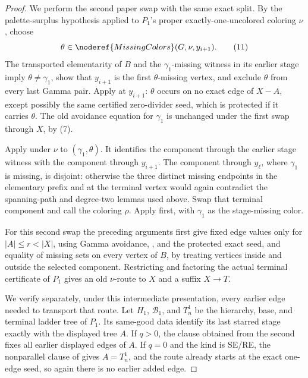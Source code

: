 \begin{proof}
We perform the second paper swap with the same exact split.  By the
palette-surplus hypothesis applied to \(P_1\)'s proper exactly-one-uncolored
coloring \(\nu\), choose
\[
                    \theta\in\noderef{MissingColors}(G,\nu,y_{i+1}). \tag{11}
\]
The transported elementarity of \(B\) and the
\(\gamma_1\)-missing witness in its earlier stage imply
\(\theta\ne\gamma_1\), show that \(y_{i+1}\) is the first
\(\theta\)-missing vertex, and exclude \(\theta\) from every last Gamma
pair.  Apply  at \(y_{i+1}\):
\(\theta\) occurs on no exact edge of \(X-A\), except possibly the same
certified zero-divider seed, which is protected if it carries \(\theta\).
The old avoidance equation for \(\gamma_1\) is unchanged under the first
swap through \(X\), by (7).

Apply  under \(\nu\) to
\((\gamma_1,\theta)\).  It identifies the component through the earlier
stage witness with the component through \(y_{i+1}\).  The component
through \(y_\ell\), where \(\gamma_1\) is missing, is disjoint: otherwise
the three distinct missing endpoints in the elementary prefix and at the
terminal vertex would again contradict the spanning-path and degree-two
lemmas used above.  Swap that terminal component and call the coloring
\(\rho\).  Apply  first, with
\(\gamma_1\) as the stage-missing color.

For this second swap the preceding arguments first give fixed edge values
only for \(|A|\le r<|X|\), using Gamma avoidance,
, and the protected exact
seed, and equality of missing sets on every vertex of \(B\), by treating
vertices inside and outside the selected component.  Restricting and
factoring the actual terminal certificate of \(P_1\) gives an old
\(\nu\)-route to \(X\) and a suffix \(X\to T\).

We verify separately, under this intermediate presentation, every
earlier edge needed to transport that route.  Let \(H_1\),
\(\mathcal B_1\), and \(T_n^1\) be the hierarchy, base, and terminal
ladder tree of \(P_1\).  Its same-good data identify its last starred
stage exactly with the displayed tree \(A\).  If \(q>0\), the
 clause obtained from the second
 fixes all earlier displayed edges of
\(A\).  If \(q=0\) and the kind is SE/RE, the nonparallel clause of
 gives \(A=T_n^1\), and the route already starts
at the exact one-edge seed, so again there is no earlier added edge.


\end{proof}
